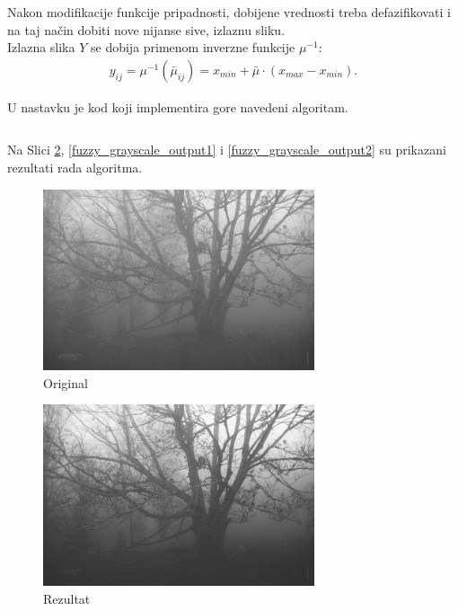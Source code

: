 \documentclass[12pt,a4paper]{article}
\theoremstyle{definition}
\theoremstyle{remark}
\theoremstyle{plain}
\begin{document}
Nakon modifikacije funkcije pripadnosti, dobijene vrednosti treba defazifikovati i na taj na\v cin dobiti nove nijanse sive, izlaznu sliku.\\
Izlazna slika $Y$ se dobija primenom inverzne funkcije $\mu^{-1}$:\\
\begin{align*}
  y_{ij} = \mu^{-1}(\bar\mu_{ij})= x_{min} + \bar\mu \cdot (x_{max} - x_{min}).
\end{align*}

U nastavku je kod koji implementira gore navedeni algoritam.

\inputminted[tabsize=2,breaklines]{cpp}{codes/latex/fuzzy_grayscale.cpp}

Na Slici \ref{tree_fuzzy_grayscale_output}, \ref{fuzzy_grayscale_output1} i \ref{fuzzy_grayscale_output2} su prikazani rezultati rada algoritma.

\begin{multicols}{2}
\begin{figure}[H]
\centering
\includegraphics[width=8cm]{images/tree.jpg}
  \caption{Original}\label{tree_fuzzy_grayscale_input}
\end{figure}
\columnbreak
\begin{figure}[H]
\centering
\includegraphics[width=8cm]{images/fuzzy_grayscale_0.jpg}
  \caption{Rezultat}\label{tree_fuzzy_grayscale_output}
\end{figure}
\end{multicols}
\end{document}
